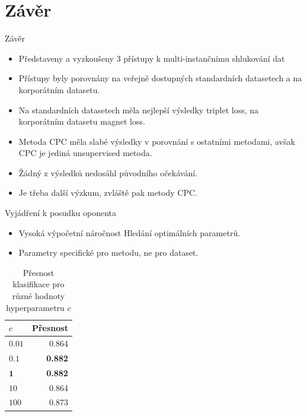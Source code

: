 \documentclass[10pt]{beamer}
\begin{document}
\section{Závěr}

\begin{frame}{Závěr}
	\begin{itemize}
		\item Představeny a vyzkoušeny 3 přístupy k multi-instančnímu shlukování dat
		\item Přístupy byly porovnány na veřejně dostupných standardních datasetech a na korporátním datasetu.
		\item Na standardních datasetech měla nejlepší výsledky triplet loss, na korporátním datasetu magnet loss.
		\item Metoda CPC měla slabé výsledky v porovnání s ostatními metodami, avšak CPC je jediná unsupervised metoda.
		\item Žádný z výsledků nedosáhl původního očekávání.
		\item Je třeba další výzkum, zvláště pak metody CPC.
	\end{itemize}
\end{frame}

\begin{frame}{Vyjádření k posudku oponenta}
  \begin{itemize}
    \item Vysoká výpočetní náročnost Hledání optimálních parametrů.
    \item Parametry specifické pro metodu, ne pro dataset.
  \end{itemize}
\end{frame}

\begin{frame}
  \begin{table}
    \centering
    \begin{tabular}{lr}
      \toprule
      \( c \)          & Přesnost \\
      \midrule
      \( 0.01 \)       & 0.864 \\
      \( 0.1 \)        & \textbf{0.882} \\
      \( \mathbf{1} \) & \textbf{0.882} \\
      \( 10 \)         & 0.864 \\
      \( 100 \)        & 0.873 \\
      \bottomrule
    \end{tabular}
    \caption{Přesnost klasifikace pro různé hodnoty hyperparametru \( c \)}\label{tab:cisco-accuracy}
  \end{table}
\end{frame}
\end{document}
